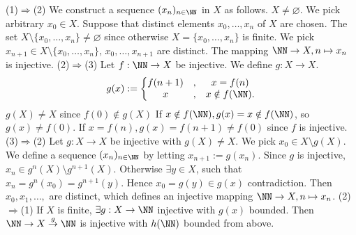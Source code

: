 \begin{proofenv}
    \quad
    \newline
    (1)$\Rightarrow$(2) We construct a sequence $(x_n)_{n\in \NN}$ in $X$ as follows. $X\not=\varnothing$. We pick arbitrary $x_0\in X$. Suppose that distinct elements $x_0, \dots,  x_n$ of $X$ are chosen. The set $X\setminus\{x_0, \dots, x_n\}\not=\varnothing$ since otherwise $X=\{x_0, \dots, x_n\}$ is finite. We pick $x_{n+1}\in X\setminus\{x_0, \dots, x_n\}, \,  x_0, \dots, x_{n+1}$ are distinct. The mapping $\NN\rightarrow X,  n\mapsto x_n$ is injective.
    \newline
    (2)$\Rightarrow$(3) Let $f:\NN\rightarrow X$ be injective. We define $g:X\rightarrow X$.
    $$g(x):=
\left\{\begin{matrix}
 f(n+1)&,  &x=f(n) \\
x&, &x\notin f(\NN).
\end{matrix}\right. $$
$g(X)\not=X$ since $f(0)\notin g(X)$ If $x\notin f(\NN), g(x)=x\notin f(\NN)$,  so $g(x)\not=f(0)$. If $x=f(n),  g(x)=f(n+1)\not=f(0)$ since $f$ is injective.
\newline
(3)$\Rightarrow$(2) Let $g:X\rightarrow X$ be injective with $g(X)\not=X$. We pick $x_0\in X\setminus g(X)$. We define a sequence $(x_n)_{n\in\NN}$ by letting $x_{n+1}:=g(x_n)$. Since $g$ is injective,  $x_n\in g^n(X)\setminus g^{n+1}(X)$.
Otherwise $\exists y\in X$,  such that $x_n=g^{n}(x_0)=g^{n+1}(y)$. Hence $x_0=g(y)\in g(x)$ contradiction. Then $x_0, x_1, \dots, $ are distinct,  which defines an injective mapping $\NN\rightarrow X, n\mapsto x_n$.
\newline
(2)$\Rightarrow$(1) If $X$ is finite,  $\exists g:X\rightarrow\NN$ injective with $g(x)$ bounded. Then $\NN\rightarrow X\overset{g}{\rightarrow}\NN$ is injective with $h(\NN)$ bounded from above.
\end{proofenv}